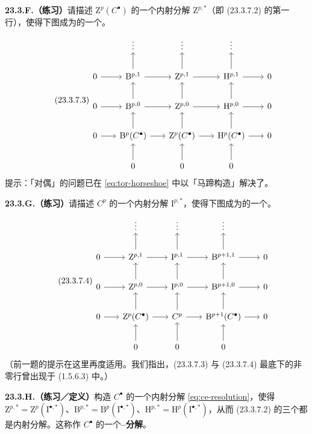 \textbf{23.3.F.（练习）}\quad 请描述 $\mathrm{Z}^p(C^\bullet)$ 的一个内射分解 $\mathrm{Z}^{p,\ast}$（即 (23.3.7.2) 的第一行），使得下图成为\trComplexes{}的一个\trShortExactSequence。
\begin{equation*}\tag{23.3.7.3}\label{eq:ce-bzh-diagram}
\begin{tikzcd}[row sep=2em, column sep=1.8em]
 & \vdots & \vdots & \vdots & \\
0 \ar[r] & \mathrm{B}^{p,1} \ar[r] \ar[u] & \mathrm{Z}^{p,1} \ar[r] \ar[u] & \mathrm{H}^{p,1} \ar[r] \ar[u] & 0 \\
0 \ar[r] & \mathrm{B}^{p,0} \ar[r] \ar[u] & \mathrm{Z}^{p,0} \ar[r] \ar[u] & \mathrm{H}^{p,0} \ar[r] \ar[u] & 0 \\
0 \ar[r] & \mathrm{B}^p(C^\bullet) \ar[r] \ar[u] & \mathrm{Z}^p(C^\bullet) \ar[r] \ar[u] & \mathrm{H}^p(C^\bullet) \ar[r] \ar[u] & 0 \\
 & 0 \ar[u] & 0 \ar[u] & 0 \ar[u] &
\end{tikzcd}
\end{equation*}
提示：「对偶」的问题已在 \eqref{eq:tor-horseshoe} 中以「马蹄构造」解决了。

\textbf{23.3.G.（练习）}\quad 请描述 $C^p$ 的一个内射分解 $\mathrm{I}^{p,\ast}$，使得下图成为\trComplexes{}的一个\trShortExactSequence。
\begin{equation*}\tag{23.3.7.4}\label{eq:ce-zib-diagram}
\begin{tikzcd}[row sep=2em, column sep=1.8em]
 & \vdots & \vdots & \vdots & \\
0 \ar[r] & \mathrm{Z}^{p,1} \ar[r] \ar[u] & \mathrm{I}^{p,1} \ar[r] \ar[u] & \mathrm{B}^{p+1,1} \ar[r] \ar[u] & 0 \\
0 \ar[r] & \mathrm{Z}^{p,0} \ar[r] \ar[u] & \mathrm{I}^{p,0} \ar[r] \ar[u] & \mathrm{B}^{p+1,0} \ar[r] \ar[u] & 0 \\
0 \ar[r] & \mathrm{Z}^p(C^\bullet) \ar[r] \ar[u] & C^p \ar[r] \ar[u] & \mathrm{B}^{p+1}(C^\bullet) \ar[r] \ar[u] & 0 \\
 & 0 \ar[u] & 0 \ar[u] & 0 \ar[u] &
\end{tikzcd}
\end{equation*}
（前一题的提示在这里再度适用。我们指出，(23.3.7.3) 与 (23.3.7.4) 最底下的非零行曾出现于 \mbox{(1.5.6.3)} 中。）

\textbf{23.3.H.（练习／定义）}\quad 构造 $C^\bullet$ 的一个内射分解 \eqref{eq:ce-resolution}，使得 $\mathrm{Z}^{p,\ast}=\mathrm{Z}^p(\mathrm{I}^{\bullet,\ast})$、$\mathrm{B}^{p,\ast}=\mathrm{B}^p(\mathrm{I}^{\bullet,\ast})$、$\mathrm{H}^{p,\ast}=\mathrm{H}^p(\mathrm{I}^{\bullet,\ast})$，从而 (23.3.7.2) 的三个\trComplexes{}都是内射分解。这称作 $C^\bullet$ 的一个\textbf{\trCartan--\trEilenberg{}分解}。

